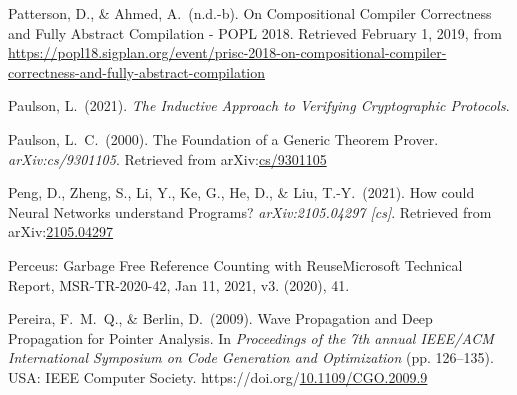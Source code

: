 \documentclass[12pt,twoside]{article}
\begin{document}
{\begin{thebibliography}{1079}
\mdbibitemlabel{}Patterson, D., \& Ahmed, A.~(n.d.-b). On Compositional Compiler Correctness and Fully Abstract Compilation - POPL 2018. Retrieved February 1, 2019, from \href{https://popl18.sigplan.org/event/prisc-2018-on-compositional-compiler-correctness-and-fully-abstract-compilation}{{\ttfamily https://\hspace{0pt}popl18.\hspace{0pt}sigplan.\hspace{0pt}org/\hspace{0pt}event/\hspace{0pt}prisc-\hspace{0pt}2018-\hspace{0pt}on-\hspace{0pt}compositional-\hspace{0pt}compiler-\hspace{0pt}correctness-\hspace{0pt}and-\hspace{0pt}fully-\hspace{0pt}abstract-\hspace{0pt}compilation}}%

\mdbibitemlabel{}Paulson, L.~(2021). \emph{The Inductive Approach to Verifying Cryptographic Protocols}.%

\mdbibitemlabel{}Paulson, L.~C.~(2000). The Foundation of a Generic Theorem Prover. \emph{arXiv:cs/9301105}. Retrieved from arXiv:\href{http://arxiv.org/abs/cs/9301105}{cs/9301105}%

\mdbibitemlabel{}Peng, D., Zheng, S., Li, Y., Ke, G., He, D., \& Liu, T.-Y.~(2021). How could Neural Networks understand Programs? \emph{arXiv:2105.04297 {}[cs]}. Retrieved from arXiv:\href{http://arxiv.org/abs/2105.04297}{2105.04297}%

\mdbibitemlabel{}Perceus: Garbage Free Reference Counting with ReuseMicrosoft Technical Report, MSR-TR-2020-42, Jan 11, 2021, v3. (2020), 41.%

\mdbibitemlabel{}Pereira, F.~M.~Q., \& Berlin, D.~(2009). Wave Propagation and Deep Propagation for Pointer Analysis. In \emph{Proceedings of the 7th annual IEEE/ACM International Symposium on Code Generation and Optimization} (pp. 126–135). USA: IEEE Computer Society. https://doi.org/\href{https://dx.doi.org/10.1109/CGO.2009.9}{10.1109/CGO.2009.9}%


\end{thebibliography}}
\end{document}
